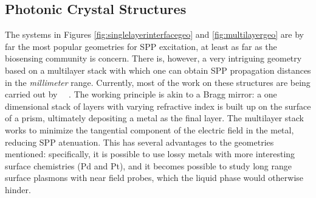 \subsection{Photonic Crystal Structures}
The systems in Figures \ref{fig:singlelayerinterfacegeo} and
\ref{fig:multilayergeo} are by far the most popular geometries for SPP
excitation, at least as far as the biosensing community is concern.  There
is, however, a very intriguing geometry based on a multilayer stack with
which one can obtain SPP propagation distances in the \textit{millimeter}
range.  Currently, most of the work on these structures are being carried
out by ~\cite{konopsky2006long}~\cite{konopsky2009long}.
The working principle is akin to a Bragg mirror: a one dimensional stack of
layers with varying refractive index is built up on the surface of a prism,
ultimately depositing a metal as the final layer.  The multilayer stack
works to minimize the tangential component of the electric field in the
metal, reducing SPP atenuation.  This has several advantages to the
geometries mentioned: specifically, it is possible to use lossy metals with
more interesting surface chemistries (Pd and Pt), and it becomes possible
to study long range surface plasmons with near field probes, which the
liquid phase would otherwise hinder.
